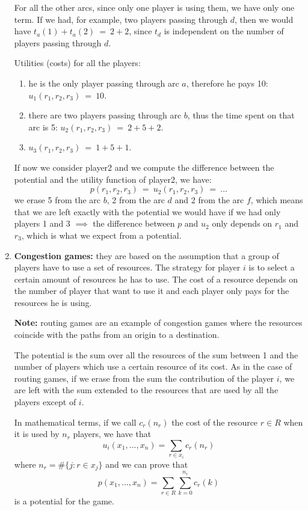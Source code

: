 \begin{enumerate}
	\noindent For all the other arcs, since only one player is using them, we 
	have only one term. If we had, for example, two players passing through 
	$d$, then we would have $t_a(1)+t_a(2)~=~2+2$, since $t_d$ is independent 
	on the number of players passing through $d$.
	
	\noindent Utilities (costs) for all the players:
	\begin{enumerate}
		\item he is the only player passing through arc $a$, therefore he 
			pays 10:\\ $u_1(r_1,r_2,r_3)~=~10$.
		\item there are two players passing through arc $b$, thus the time 
			spent on that arc is 5: $u_2(r_1,r_2,r_3)~=~2+5+2$.
		\item $u_3(r_1,r_2,r_3)~=~1+5+1$.
	\end{enumerate}
		
	\noindent If now we consider player2 and we compute the difference between 
	the potential and the utility function of player2, we have: 
	\[
		p(r_1,r_2,r_3)~=~u_2(r_1,r_2,r_3)~=~...
	\]
	we erase 5 from the arc $b$, 2 from the arc $d$ and 2 from the arc $f$, which 
	means that we are left exactly with the potential we would have if we had 
	only players 1 and 3 $\implies$ the difference between $p$ and $u_2$ only depends 
	on $r_1$ and $r_3$, which is what we expect from a potential.

	\item \textbf{Congestion games:} they are based on the assumption that a group of 
	players have to use a set of resources. The strategy for player $i$ is to 
	select a certain amount of resources he has to use. The cost of a resource 
	depends on the number of player that want to use it and each player only 
	pays for the resources he is using.
	
	\noindent \textbf{Note:} routing games are an example of congestion games 
	where the resources coincide with the paths from an origin to a destination.
	
	\noindent The potential is the sum over all the resources of the sum between 
	1 and the number of players which use a certain resource of its cost. As in 
	the case of routing games, if we erase from the sum the contribution of the 
	player $i$, we are left with the sum extended to the resources that are used 
	by all the players except of $i$.
	
	\noindent In mathematical terms, if we call $c_r(n_r)$ the cost of the resource $r \in R$ when it is used by $n_r$ players, we have that
	\[
		u_i(x_1,...,x_n) = \sum_{r \in x_i}{c_r(n_r)}
	\]
	where $n_r = \#\{j: r \in x_j\}$ and we can prove that
	\[
		p(x_1,...,x_n) = \sum_{r \in R}{\sum_{k=0}^{n_r}{c_r(k)}}
	\]
	is a potential for the game.


\end{enumerate}
